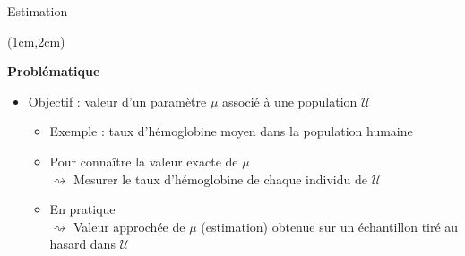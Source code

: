 \documentclass{beamer}
\newcommand{\pop}{\mathcal{U}} %
\begin{document}
\begin{frame}{Estimation}
\begin{textblock*}{\textwidth}(1cm,2cm)

\begin{center}{\bf \Large Problématique} \end{center}

\begin{itemize}
\item Objectif : valeur d'un paramètre $\mu$ associé à une population $\pop$
\vspace{0.5cm}
\begin{itemize}
\item Exemple :  taux d'hémoglobine moyen dans la population humaine
\vspace{0.2cm}
\item Pour connaître la valeur exacte de $\mu$\\

$\rightsquigarrow$ Mesurer le taux d'hémoglobine de chaque individu de $\pop$
\vspace{0.2cm}
\item En pratique \\
$\rightsquigarrow$ Valeur approchée de $\mu$ (estimation) obtenue sur un échantillon tiré au hasard dans $\pop$
\end{itemize}

\end{itemize}

 \end{textblock*}

\end{frame}

\end{document}
